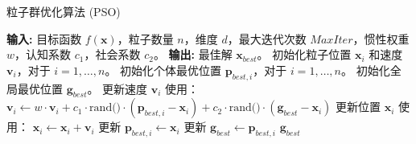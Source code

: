 \documentclass{article}
\begin{document}
	
	\begin{algorithm}
		\caption{粒子群优化算法 (PSO)}
		\begin{algorithmic}[1]
			\State \textbf{输入:} 目标函数 $f(\mathbf{x})$，粒子数量 $n$，维度 $d$，最大迭代次数 $MaxIter$，惯性权重 $w$，认知系数 $c_1$，社会系数 $c_2$。
			\State \textbf{输出:} 最佳解 $\mathbf{x}_{best}$。
			\State 初始化粒子位置 $\mathbf{x}_i$ 和速度 $\mathbf{v}_i$，对于 $i = 1, \ldots, n$。
			\State 初始化个体最优位置 $\mathbf{p}_{best,i}$，对于 $i = 1, \ldots, n$。
			\State 初始化全局最优位置 $\mathbf{g}_{best}$。
			\State 更新速度 $\mathbf{v}_i$ 使用：
			\State $\mathbf{v}_i \gets w \cdot \mathbf{v}_i + c_1 \cdot \text{rand()} \cdot (\mathbf{p}_{best,i} - \mathbf{x}_i) + c_2 \cdot \text{rand()} \cdot (\mathbf{g}_{best} - \mathbf{x}_i)$
			\State 更新位置 $\mathbf{x}_i$ 使用：
			\State $\mathbf{x}_i \gets \mathbf{x}_i + \mathbf{v}_i$
			\State 更新 $\mathbf{p}_{best,i} \gets \mathbf{x}_i$
			\EndIf
			\EndFor
			\State 更新 $\mathbf{g}_{best} \gets \mathbf{p}_{best,i}$
			\EndIf
			\EndFor
			\State \Return $\mathbf{g}_{best}$
		\end{algorithmic}
	\end{algorithm}
	
\end{document}
